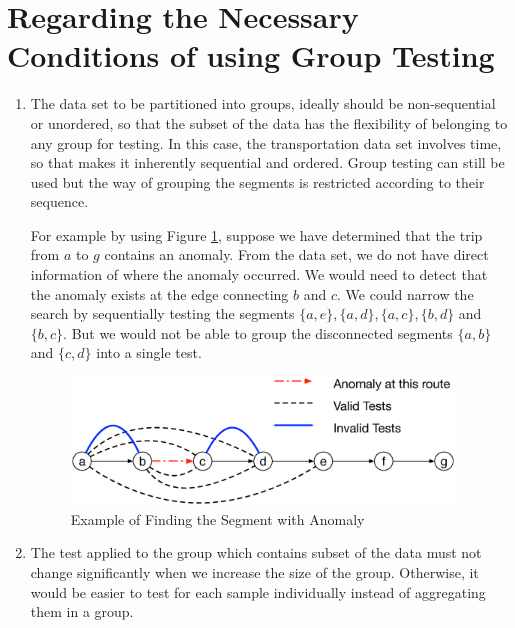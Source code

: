 \documentclass{sig-alternate}
\begin{document}
\section{Regarding the Necessary Conditions of using Group Testing}


\begin{enumerate}
\item The data set to be partitioned into groups, ideally should be non-sequential or unordered, so that the subset of the data has the flexibility of belonging to any group for testing. In this case, the transportation data set involves time, so that makes it inherently sequential and ordered. Group testing can still be used but the way of grouping the segments is restricted according to their sequence.

For example by using Figure \ref{fig:group_testing_example}, suppose we have determined that the trip from $a$ to $g$ contains an anomaly. From the data set, we do not have direct information of where the anomaly occurred. We would need to detect that the anomaly exists at the edge connecting $b$ and $c$. We could narrow the search by sequentially testing the segments $\{a, e\}, \{a, d\}, \{a, c\}, \{b, d\}$ and $\{b, c\}$. But we would not be able to group the disconnected segments $\{a, b\}$ and $\{c, d\}$ into a single test.

\begin{figure}[htb]
	\centering
	\includegraphics[width=4.0in]{group_testing_example}
	\caption{Example of Finding the Segment with Anomaly}
	\label{fig:group_testing_example}
\end{figure}

\item The test applied to the group which contains subset of the data must not change significantly when we increase the size of the group. Otherwise, it would be easier to test for each sample individually instead of aggregating them in a group.
\end{enumerate}
\end{document}

